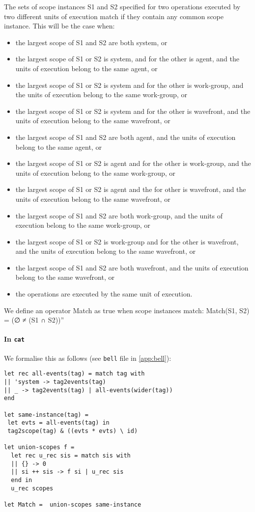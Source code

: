 \documentclass[a4paper]{article}
\begin{document}
The sets of scope instances S1 and S2 specified for two operations executed by
two different units of execution match if they contain any common scope
instance. This will be the case when:
\begin{itemize}
\item the largest scope of S1 and S2 are both system, or
\item the largest scope of S1 or S2 is system, and for the other is agent, and the units of execution belong to the same agent, or
\item the largest scope of S1 or S2 is system and for the other is work-group, and the units of execution belong to the same work-group, or
\item the largest scope of S1 or S2 is system and for the other is wavefront, and the units of execution belong to the same wavefront, or
\item the largest scope of S1 and S2 are both agent, and the units of execution belong to the same agent, or
\item the largest scope of S1 or S2 is agent and for the other is work-group, and the units of execution belong to the same work-group, or
\item the largest scope of S1 or S2 is agent and the for other is wavefront, and the units of execution belong to the same wavefront, or
\item the largest scope of S1 and S2 are both work-group, and the units of execution belong to the same work-group, or
\item the largest scope of S1 or S2 is work-group and for the other is wavefront, and the units of execution belong to the same wavefront, or
\item the largest scope of S1 and S2 are both wavefront, and the units of execution belong to the same wavefront, or
\item the operations are executed by the same unit of execution.
\end{itemize}
We define an operator Match as true when scope instances match:
Match(S1, S2) = (∅ ≠ (S1 ∩ S2))''

\paragraph{In {\tt cat}} We formalise this as follows (see {\tt bell} file in
\myapp\ref{app:bell}):
\begin{verbatim}
let rec all-events(tag) = match tag with
|| 'system -> tag2events(tag)
|| _ -> tag2events(tag) | all-events(wider(tag))
end

let same-instance(tag) =
 let evts = all-events(tag) in
 tag2scope(tag) & ((evts * evts) \ id)

let union-scopes f =
  let rec u_rec sis = match sis with
  || {} -> 0
  || si ++ sis -> f si | u_rec sis
  end in
  u_rec scopes

let Match =  union-scopes same-instance
\end{verbatim}
\end{document}
